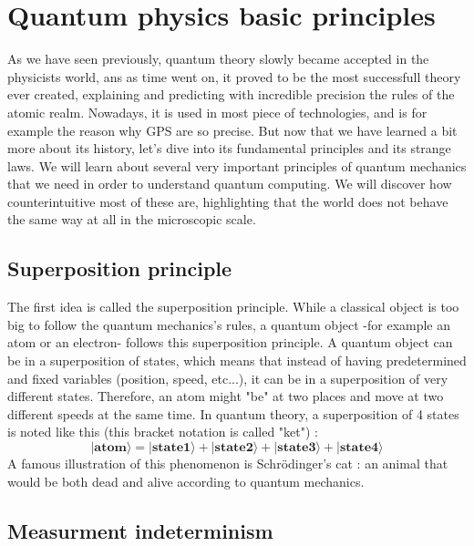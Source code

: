 \documentclass[a4paper,12pt]{report}
\newcommand{\quSt}[1]{\bm{|#1\rangle}}
\newcommand{\para}[1]{\par{#1}\\}
\begin{document}
    \section{Quantum physics basic principles}

\para{
    As we have seen previously, quantum theory slowly became accepted in the physicists world, ans as time went on, it proved to be the most successfull theory ever created, explaining and predicting with incredible precision the rules of the atomic realm. Nowadays, it is used in most piece of technologies, and is for example the reason why GPS are so precise. But now that we have learned a bit more about its history, let's dive into its fundamental principles and its strange laws. We will learn about several very important principles of quantum mechanics that we need in order to understand quantum computing. We will discover how counterintuitive most of these are, highlighting that the world does not behave the same way at all in the microscopic scale.
}

        \subsection{Superposition principle} \label{superposition}

\para{
    The first idea is called the superposition principle. While a classical object is too big to follow the quantum mechanics's rules, a quantum object -for example an atom or an electron- follows this superposition principle. A quantum object can be in a superposition of states, which means that instead of having predetermined and fixed variables (position, speed, etc...), it can be in a superposition of very different states. Therefore, an atom might "be" at two places and move at two different speeds at the same time. In quantum theory, a superposition of 4 states is noted like this (this bracket notation is called "ket") :
    \begin{equation}
        \quSt{atom} = \quSt{state1} + \quSt{state2} + \quSt{state3} + \quSt{state4}
    \end{equation}
    A famous illustration of this phenomenon is Schrödinger's cat : an animal that would be both dead and alive according to quantum mechanics.
}

        \subsection{Measurment indeterminism}
\end{document}
